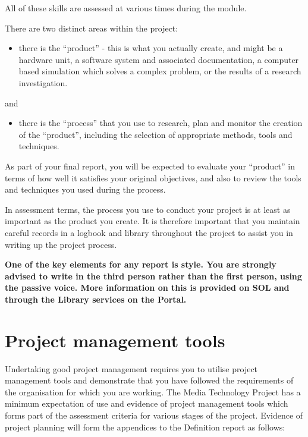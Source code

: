 All of these skills are assessed at various times during the module.

There are two distinct areas within the project:

\begin{itemize}
    \item there is the “product” - this is what you actually create, and might be a hardware unit, a
    software system and associated documentation, a computer based simulation which
    solves a complex problem, or the results of a research investigation.
\end{itemize}

and

\begin{itemize}
    \item there is the “process” that you use to research, plan and monitor the creation of the
    “product”, including the selection of appropriate methods, tools and techniques.
\end{itemize}

As part of your final report, you will be expected to evaluate your “product” in terms of how well it satisfies your original objectives, and also to review the tools and techniques you used during the process.

In assessment terms, the process you use to conduct your project is at least as important as the product you create. It is therefore important that you maintain careful records in a logbook and library throughout the project to assist you in writing up the project process.

\textbf{One of the key elements for any report is style. You are strongly advised to write in the third person rather than the first person, using the passive voice. More information on this is provided on SOL and through the Library services on the Portal.}

\section*{Project management tools}

Undertaking good project management requires you to utilise project management tools and
demonstrate that you have followed the requirements of the organisation for which you are
working. The Media Technology Project has a minimum expectation of use and evidence of project management tools which forms part of the assessment criteria for various stages of the project. Evidence of project planning will form the appendices to the Definition report as follows:

